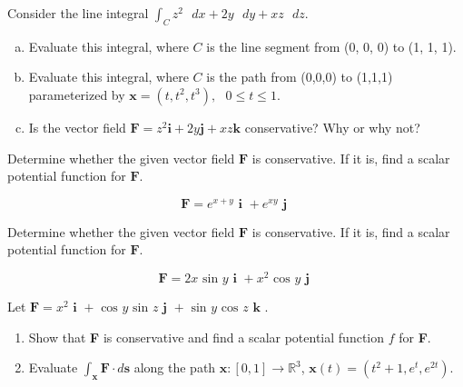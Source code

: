 \documentclass[11pt,letterpaper,boxed]{pset}
\begin{document}
    \begin{problem} [6.3.1]
    	Consider the line integral $\int_C z^2\textrm{ } dx + 2y\textrm{ } dy + xz \textrm{ } dz$.
    	
    	\begin{enumerate} [(a)]
    	    \item Evaluate this integral, where $C$ is the line segment from (0, 0, 0) to (1, 1, 1).
    	    \item Evaluate this integral, where $C$ is the path from (0,0,0) to (1,1,1) parameterized by $\textbf{x} = (t,t^2,t^3), \textrm{ } 0 \leq t \leq 1.$
    	    \item Is the vector field $\textbf{F} = z^2\textbf{i} + 2y\textbf{j} + xz\textbf{k}$ 
    		conservative? Why or why not?
    	\end{enumerate}
    	
    \end{problem}
    \newpage
    
    
    \begin{problem} [6.3.3]
    
    	Determine whether the given vector field $\textbf{F}$ is conservative. If it is, find a scalar potential function for $\textbf{F}$.
    
    	\[\textbf{F} = e^{x+y}\textbf{ i } + e^{xy}\textbf{ j }\]
    
    \end{problem}
    \newpage
    
    \begin{problem} [6.3.4]
    	Determine whether the given vector field $\textbf{F}$ is 
    		conservative. If it is, find a scalar potential function for $\textbf{F}$.
    
    	$$\textbf{F} = 2x\textrm{ sin } y \textbf{ i } + x^2 \textrm{ cos } y \textbf{ j }$$
    
    \end{problem}
    \newpage
    
    
    \begin{problem} [6.3.25]
    
    	Let $\textbf{F} = x^2 \textbf{ i } + 
    		\textrm{ cos } y \textrm{ sin } z \textbf{ j } + \textrm{ sin } y 
    		\textrm{ cos } z \textbf{ k }$.\\
        
        \begin{enumerate}
            \item Show that \textbf{F} is conservative and find a scalar potential function $f$ for \textbf{F}.
            \item Evaluate $\int_\textbf{x} \textbf{F} \cdot d\textbf{s}$ along the path 
    		$\textbf{x}:[0,1] \rightarrow \mathbb{R}^3$, 
    		$\textbf{x}(t) = (t^2+1, e^t, e^{2t})$.
        \end{enumerate}
    
    \end{problem}
    \newpage
    
\end{document}
